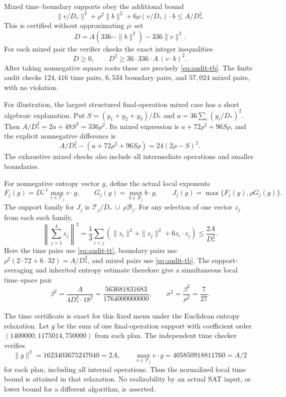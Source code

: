 Mixed time--boundary supports obey the additional bound
\begin{equation}\label{eq:audit-tb}
 \|v/D_*\|^2+\rho^2\|b\|^2+6\rho(v/D_*)\cdot b\le A/D_*^2.
\end{equation}
This is certified without approximating $\rho$: set
\[
 D=A(336-\|b\|^2)-336\|v\|^2.
\]
For each mixed pair the verifier checks the exact integer inequalities
\[
 D\ge0,\qquad D^2\ge36\cdot336\cdot A\,(v\cdot b)^2.
\]
After taking nonnegative square roots these are precisely
\eqref{eq:audit-tb}. The finite audit checks $124{,}416$ time pairs,
$6{,}534$ boundary pairs, and $57{,}024$ mixed pairs, with no violation.

For illustration, the largest structured final-operation mixed case has
a short algebraic explanation. Put $S=(y_1+y_2+y_3 )/D_*$ and
$a=36\sum_i(y_i/D_*)^2$. Then
$A/D_*^2=2a+48S^2=336\rho^2$. Its mixed expression is
$a+72\rho^2+96S\rho$, and the explicit nonnegative difference is
\[
 A/D_*^2-(a+72\rho^2+96S\rho)=24(2\rho-S)^2.
\] The exhaustive mixed checks also include all intermediate
operations and smaller boundaries.

For nonnegative entropy vector $g$, define the actual local exponents
\[
 F_j(g)=D_*^{-1}\max_{v\in\mathcal T_j}v\cdot g,
 \qquad G_j(g)=\max_{b\in\mathcal B_j}b\cdot g,
 \qquad J_j(g)=\max\{F_j(g),\rho G_j(g)\}.
\]
The support family for $J_j$ is
$\mathcal T_j/D_*\ \cup\ \rho\mathcal B_j$.
For any selection of one vector $z_j$ from each such family,
\[
 \left\|\sum_{j=1}^4z_j\right\|^2
 =\frac13\sum_{i<j}
       (\|z_i\|^2+\|z_j\|^2+6z_i\cdot z_j)
 \le\frac{2A}{D_*^2}.
\]
Here the time pairs use \eqref{eq:audit-tt}, boundary pairs use
$\rho^2(2\cdot72+6\cdot32)=A/D_*^2$, and mixed pairs use
\eqref{eq:audit-tb}. The support-averaging and inherited entropy estimate
therefore give a simultaneous local time--space pair
\begin{equation}\label{eq:audit-joint-local}
 \beta^2=\frac{A}{4D_*^2\cdot18^2}
        =\frac{563681831683}{1764000000000},
 \qquad \sigma^2=\frac{\beta^2}{\rho^2}=\frac7{27}.
\end{equation}

The time certificate is exact for this fixed menu under the Euclidean
entropy relaxation. Let $g$ be the sum of one final-operation support
with coefficient order $(1400000,1175014,750000)$ from each plan.
The independent time checker verifies
\[
 \|g\|^2=1623403675247040=2A,\qquad
 \max_{v\in\mathcal T_j}v\cdot g=405850918811760=A/2
\]
for each plan, including all internal operations. Thus the normalized
local time bound is attained in that relaxation. No realizability by an
actual SAT input, or lower bound for a different algorithm, is asserted.

